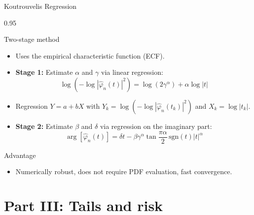 \documentclass[9pt, aspectratio=169, t]{beamer}
\begin{document}
\begin{frame}{Koutrouvelis Regression}
    \begin{cminipage}{0.95\textwidth}
\begin{block}{Two-stage method}
\begin{itemize}\setlength{\itemsep}{0pt}
    \item Uses the empirical characteristic function (ECF).
\end{itemize}
\end{block}

\begin{itemize}\setlength{\itemsep}{0pt}
    \item \textbf{Stage 1:} Estimate $\alpha$ and $\gamma$ via linear regression:
$$\log\left(-\log|\hat{\varphi}_n(t)|^2\right) = \log(2\gamma^\alpha) + \alpha \log|t|$$
    \item Regression $Y = a + bX$ with $Y_k = \log(-\log|\hat{\varphi}_n(t_k)|^2)$ and $X_k = \log|t_k|$.
    \item \textbf{Stage 2:} Estimate $\beta$ and $\delta$ via regression on the imaginary part:
$$\arg[\hat{\varphi}_n(t)] = \delta t - \beta\gamma^\alpha \tan\frac{\pi\alpha}{2}\,\text{sgn}(t)|t|^\alpha$$
\end{itemize}

\begin{alertblock}{Advantage}
\begin{itemize}\setlength{\itemsep}{0pt}
    \item Numerically robust, does not require PDF evaluation, fast convergence.
\end{itemize}
\end{alertblock}
    \end{cminipage}
\end{frame}

\section{Part III: Tails and risk}
\end{document}
